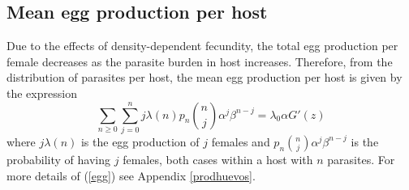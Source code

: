 \documentclass[useAMS,referee,usenatbib]{biom}
\begin{document}

\subsection{Mean egg production per host}
Due to the effects of density-dependent fecundity, the total egg production per female decreases as the parasite burden in host increases.
Therefore, from the distribution of parasites per host, the mean egg production per host %
is given by the expression
\begin{equation}\label{egg}
\sum_{n\geq 0}\sum_{j=0}^{n}j\lambda(n)p_n\binom{n}{j}\alpha^j\beta^{n-j}=\lambda_0\alpha G'(z)
\end{equation}
where $j\lambda(n)$ is the egg production of $j$ females and $p_n\binom{n}{j}\alpha^j\beta^{n-j}$ is the probability of having $j$ females, both cases within a host with $n$ parasites. For more details of (\ref{egg}) see Appendix \eqref{prodhuevos}.
\end{document}

